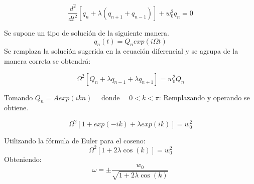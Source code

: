 \documentclass[11pt,letterpaper,twocolumn]{article}
\begin{document}
\begin{equation}
\frac { { d }^{ 2 } }{ d{ t }^{ 2 } } \left[ { q }_{ n }+\lambda \left( { q }_{ n+1 }+{ q }_{ n-1 } \right) \right]+{ w }_{ 0 }^{ 2 }{ q }_{ n } =0
\end{equation}

Se supone un tipo de solución de la siguiente manera.
$$
{ q }_{ n }\left( t \right) ={ Q }_{ n }exp\left( i\Omega t \right) $$
Se remplaza la solución sugerida en la ecuación diferencial y se agrupa de la manera correta se obtendrá:

\begin{equation}
{ \Omega  }^{ 2 }\left[ { Q }_{ n }+\lambda { q }_{ n-1 }+\lambda { q }_{ n+1 } \right] ={ w }_{ 0 }^{ 2 }{ Q }_{ n }
\end{equation}

Tomando ${Q}_{n}=Aexp\left(ikn\right) \quad$ donde $\quad 0<k<\pi$: Remplazando y operando se obtiene.

$${\Omega}^{2}\left[1+exp\left(-ik \right)+\lambda exp\left(ik\right)\right] ={w}_{0}^{2}$$

Utilizando la fórmula de Euler para el coseno:
$$\Omega^{2} \left[1+2\lambda\cos(k)\right]=w_{0}^{2}$$
Obteniendo:
$$\omega = \pm \frac{w_{0}}{\sqrt{1+2\lambda\cos(k)}}$$
\end{document}
